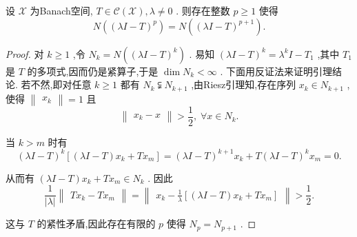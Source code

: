 \documentclass[lang=cn,newtx,10pt,scheme=chinese,thmcnt=chapter]{elegantbook}
\begin{document}
\begin{lemma}
     设 \(\mathcal{X}\) 为Banach空间, \(T \in  \mathcal{C}\left( \mathcal{X}\right) ,\lambda  \neq  0\) . 则存在整数 \(p \geq  1\) 使得
\begin{equation*}
N\left( {\left( \lambda I - T\right) }^{p}\right)  = N\left( {\left( \lambda I - T\right) }^{p + 1}\right) .
\end{equation*}
\end{lemma}
\begin{proof}
    对 \(k \geq  1\) ,令 \({N}_{k} = N\left( {\left( \lambda I - T\right) }^{k}\right)\) . 易知 \({\left( \lambda I - T\right) }^{k} = {\lambda }^{k}I - {T}_{1}\) ,其中 \({T}_{1}\) 是 \(T\) 的多项式,因而仍是紧算子,于是 \(\dim {N}_{k} < \infty\) . 下面用反证法来证明引理结论. 若不然,即对任意 \(k \geq  1\) 都有 \({N}_{k} \subsetneqq  {N}_{k + 1}\) ,由Riesz引理知,存在序列 \({x}_{k} \in  {N}_{k + 1}\) ,使得 \(\begin{Vmatrix}{x}_{k}\end{Vmatrix} = 1\) 且
\begin{equation*}
\begin{Vmatrix}{{x}_{k} - x}\end{Vmatrix} > \frac{1}{2},\;\forall x \in  {N}_{k}.
\end{equation*}

当 \(k > m\) 时有
\begin{equation*}
{\left( \lambda I - T\right) }^{k}\left\lbrack  {\left( {{\lambda I} - T}\right) {x}_{k} + T{x}_{m}}\right\rbrack   = {\left( \lambda I - T\right) }^{k + 1}{x}_{k} + T{\left( \lambda I - T\right) }^{k}{x}_{m} = 0.
\end{equation*}

从而有 \(\left( {{\lambda I} - T}\right) {x}_{k} + T{x}_{m} \in  {N}_{k}\) . 因此
\begin{equation*}
\frac{1}{\left| \lambda \right| }\begin{Vmatrix}{T{x}_{k} - T{x}_{m}}\end{Vmatrix} = \begin{Vmatrix}{{x}_{k} - \frac{1}{\lambda }\left\lbrack  {\left( {{\lambda I} - T}\right) {x}_{k} + T{x}_{m}}\right\rbrack  }\end{Vmatrix} > \frac{1}{2}.
\end{equation*}

这与 \(T\) 的紧性矛盾,因此存在有限的 \(p\) 使得 \({N}_{p} = {N}_{p + 1}\) .

\end{proof}
\end{document}
